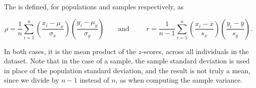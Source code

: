 \begin{definition}
The  is defined, for populations and samples respectively, as

$$\rho = \frac{1}{n}\sum_{i=1}^{n}\left(\frac{x_i - \mu_x}{\sigma_x}\right)\left(\frac{y_i - \mu_y}{\sigma_y}\right) \qquad \text{and} \ \ \qquad r = \frac{1}{n-1}\sum_{i=1}^{n}\left(\frac{x_i - \overline{x}}{s_x}\right)\left(\frac{y_i - \overline{y}}{s_y}\right).$$

In both cases, it is the mean product of the $z$-scores, across all individuals in the dataset. Note that in the case of a sample, the sample standard deviation is used in place of the population standard deviation, and the result is not truly a mean, since we divide by $n-1$ instead of $n$, as when computing the sample variance.
\end{definition}

